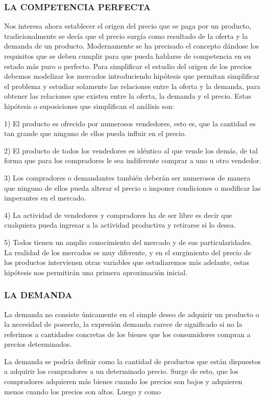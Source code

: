 \subsubsection*{LA COMPETENCIA PERFECTA}
Nos interesa ahora establecer el origen del precio que se paga por un producto, tradicionalmente se decía que el precio surgía como resultado de la oferta y la demanda de un producto. Modernamente se ha precisado el concepto dándose los requisitos que se deben cumplir para que pueda hablarse de competencia en su estado más puro o perfecto. Para simplificar el estudio del origen de los precios debemos modelizar los mercados introduciendo hipótesis que permitan simplificar el problema y estudiar solamente las relaciones entre la oferta y la demanda, para obtener las relaciones que existen entre la oferta, la demanda y el precio. Estas hipótesis o suposiciones que simplifican el análisis son:

1) El producto es ofrecido por numerosos vendedores, esto es, que la cantidad es tan grande que ninguno de ellos pueda influir en el precio.

2) El producto de todos los vendedores es idéntico al que vende los demás, de tal forma que para los compradores le sea indiferente comprar a uno u otro vendedor.

3) Los compradores o demandantes también deberán ser numerosos de manera que ninguno de ellos pueda alterar el precio o imponer condiciones o modificar las imperantes en el mercado.

4) La actividad de vendedores y compradores ha de ser libre es decir que cualquiera pueda ingresar a la actividad productiva y retirarse si lo desea.

5) Todos tienen un amplio conocimiento del mercado y de sus particularidades. La realidad de los mercados es muy diferente, y en el surgimiento del precio de los productos intervienen otras variables que estudiaremos más adelante, estas hipótesis nos permitirán una primera aproximación inicial.

\subsubsection*{LA DEMANDA}
La demanda no consiste únicamente en el simple deseo de adquirir un producto o la necesidad de poseerlo, la expresión demanda carece de significado si no la referimos a cantidades concretas de los bienes que los consumidores compran a precios determinados.

La demanda se podría definir como la cantidad de productos que están dispuestos a adquirir los compradores a un determinado precio. Surge de esto, que los compradores adquieren más bienes cuando los precios son bajos y adquieren menos cuando los precios son altos. Luego y como


